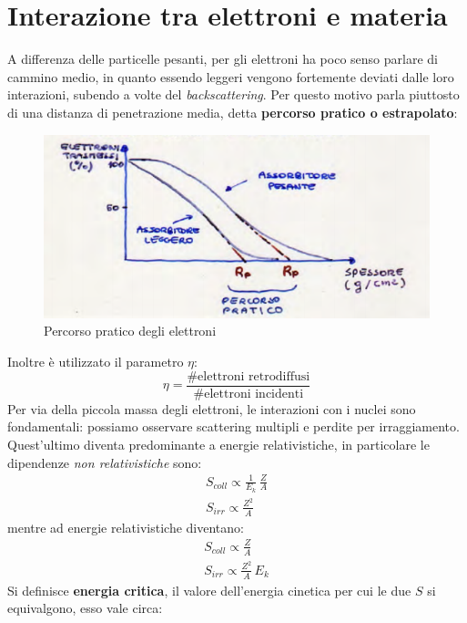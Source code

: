 \section{Interazione tra elettroni e materia}
A differenza delle particelle pesanti, per gli elettroni ha poco senso parlare di cammino medio, in quanto essendo leggeri vengono
fortemente deviati dalle loro interazioni, subendo a volte del \textit{backscattering}.
Per questo motivo parla piuttosto di una distanza di penetrazione media, detta \textbf{percorso pratico o estrapolato}:
\begin{figure}[htbp]
\begin{center}
\includegraphics[scale=1]{./Immagini/RangeElettroni.png}
\caption{Percorso pratico degli elettroni}
\end{center}
\end{figure}
Inoltre \`e utilizzato il parametro $\eta$:
\begin{equation*}
\eta = \frac{\# \text{elettroni retrodiffusi}}{\# \text{elettroni incidenti}}
\end{equation*}
Per via della piccola massa degli elettroni, le interazioni con i nuclei sono fondamentali: possiamo osservare scattering multipli e perdite per irraggiamento.\\
Quest'ultimo diventa predominante a energie relativistiche, in particolare le dipendenze \textit{non relativistiche} sono:
\begin{gather*}
S_{coll} \propto \frac{1}{E_k} \, \frac{Z}{A}\\
S_{irr} \propto \frac{Z^2}{A}
\end{gather*}
mentre ad energie relativistiche diventano:
\begin{gather*}
S_{coll} \propto \frac{Z}{A}\\
S_{irr} \propto \frac{Z^2}{A}\, E_k
\end{gather*}
Si definisce \textbf{energia critica}, il valore dell'energia cinetica per cui le due $S$ si equivalgono, esso vale circa:
